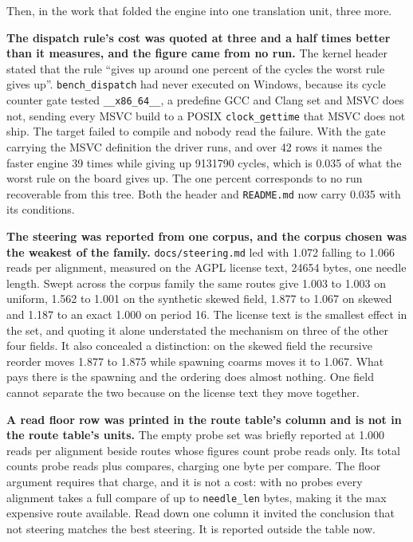 Then, in the work that folded the engine into one translation unit, three more.

\textbf{The dispatch rule's cost was quoted at three and a half times better than it measures, and the figure came from no run.} The kernel header stated that the rule ``gives up around one percent of the cycles the worst rule gives up''. \texttt{bench\_dispatch} had never executed on Windows, because its cycle counter gate tested \texttt{\_\_x86\_64\_\_}, a predefine GCC and Clang set and MSVC does not, sending every MSVC build to a POSIX \texttt{clock\_gettime} that MSVC does not ship. The target failed to compile and nobody read the failure. With the gate carrying the MSVC definition the driver runs, and over 42 rows it names the faster engine 39 times while giving up 9131790 cycles, which is 0.035 of what the worst rule on the board gives up. The one percent corresponds to no run recoverable from this tree. Both the header and \texttt{README.md} now carry 0.035 with its conditions.

\textbf{The steering was reported from one corpus, and the corpus chosen was the weakest of the family.} \texttt{docs/steering.md} led with 1.072 falling to 1.066 reads per alignment, measured on the AGPL license text, 24654 bytes, one needle length. Swept across the corpus family the same routes give 1.003 to 1.003 on uniform, 1.562 to 1.001 on the synthetic skewed field, 1.877 to 1.067 on skewed and 1.187 to an exact 1.000 on period 16. The license text is the smallest effect in the set, and quoting it alone understated the mechanism on three of the other four fields. It also concealed a distinction: on the skewed field the recursive reorder moves 1.877 to 1.875 while spawning coarms moves it to 1.067. What pays there is the spawning and the ordering does almost nothing. One field cannot separate the two because on the license text they move together.

\textbf{A read floor row was printed in the route table's column and is not in the route table's units.} The empty probe set was briefly reported at 1.000 reads per alignment beside routes whose figures count probe reads only. Its total counts probe reads plus compares, charging one byte per compare. The floor argument requires that charge, and it is not a cost: with no probes every alignment takes a full compare of up to \texttt{needle\_len} bytes, making it the max expensive route available. Read down one column it invited the conclusion that not steering matches the best steering. It is reported outside the table now.

